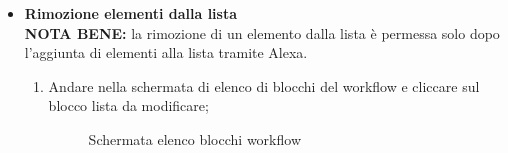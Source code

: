 \newpage
\begin{itemize}
	\item \textbf{Rimozione elementi dalla lista} \\
	\textbf{NOTA BENE:} la rimozione di un elemento dalla lista è permessa solo dopo l'aggiunta di elementi alla lista tramite Alexa.
	\begin{enumerate}
		\item Andare nella schermata di elenco di blocchi del workflow e cliccare sul blocco lista da modificare;
		\begin{figure}[!ht]
			\centering
			\caption{Schermata elenco blocchi workflow}
		\end{figure}

\end{enumerate}
\end{itemize}
